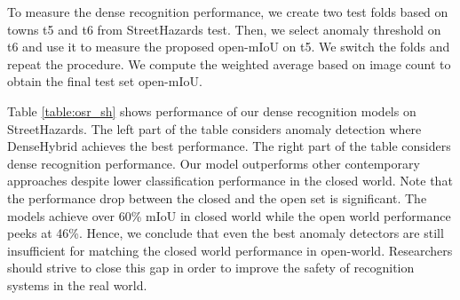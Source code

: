 \documentclass[runningheads]{llncs}
\begin{document}
To measure the dense recognition performance, we create two test folds based on towns t5 and t6 from StreetHazards test. 
Then, we select anomaly threshold on t6 and use it to measure the proposed open-mIoU on t5.
We switch the folds and repeat the procedure.
We compute the weighted average based on image count to obtain the final test set open-mIoU.

Table \ref{table:osr_sh} shows performance of our dense recognition models on StreetHazards.
The left part of the table considers anomaly detection where DenseHybrid achieves the best performance.
The right part of the table considers dense recognition performance.
Our model outperforms other contemporary approaches despite lower classification performance in the closed world.
Note that the performance drop between the closed and the open set is significant.
The models achieve over 60\% mIoU in closed world while the open world performance peeks at 46\%.
Hence, we conclude that even the best anomaly detectors are still insufficient for matching the closed world performance in open-world.
Researchers should strive to close this gap in order to improve the safety of recognition systems in the real world. 
\end{document}

